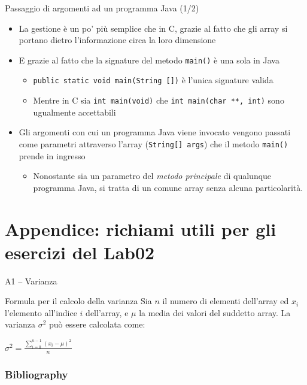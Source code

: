 \documentclass[presentation]{beamer}
\newcommand{\lab}{Lab02}
\begin{document}
\begin{frame}{Passaggio di argomenti ad un programma Java (1/2)}
	\begin{itemize}\itemsep10pt
	\item La gestione è un po' più semplice che in C, grazie al fatto che gli array si portano dietro l'informazione circa la loro dimensione
		\item E grazie al fatto che la signature del metodo \texttt{main()} è una sola in Java
		\begin{itemize}
			\item \texttt{public static void main(String [])} è l'unica signature valida
			\item Mentre in C sia \texttt{int main(void)} che \texttt{int main(char **, int)} sono ugualmente accettabili
		\end{itemize}
	
	
		\item Gli argomenti con cui un programma Java viene invocato vengono passati come parametri attraverso l'array (\texttt{String[] args}) che il metodo \texttt{main()} prende in ingresso
		\begin{itemize}
		\item Nonostante sia un parametro del \emph{metodo principale} di qualunque programma Java, si tratta di un comune array senza alcuna particolarità.
		\end{itemize}
		
	\end{itemize}
\end{frame}

\section{Appendice: richiami utili per gli esercizi del {\lab}}

\begin{frame}{A1 -- Varianza}

\begin{block}{Formula per il calcolo della varianza}
Sia $n$ il numero di elementi dell'array ed $x_i$ l'elemento all'indice $i$ dell'array, e $\mu$ la media dei valori del suddetto array. La varianza $\sigma^2$ può essere calcolata come:

\centering
\Huge
$\sigma^2 = \frac{\displaystyle\sum_{i=0}^{n-1}(x_i - \mu)^2} {n}$
\end{block}
\end{frame}

\begin{frame}[allowframebreaks]
 \frametitle{Bibliography}
	
	\small
 
\end{frame}
\end{document}

